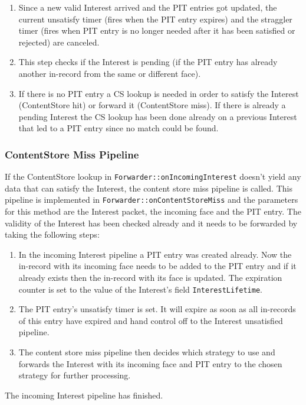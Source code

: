 \begin{enumerate}
\item Since a new valid Interest arrived and the PIT entries got updated, the current unsatisfy timer (fires when the PIT entry expires) and the straggler timer (fires when PIT entry is no longer needed after it has been satisfied or rejected) are canceled.
\item This step checks if the Interest is pending (if the PIT entry has already another in-record from the same or different face).
\item If there is no PIT entry a CS lookup is needed in order to satisfy the Interest (ContentStore hit) or forward it (ContentStore miss). If there is already a pending Interest the CS lookup has been done already on a previous Interest that led to a PIT entry since no match could be found.
\end{enumerate}

\subsubsection{ContentStore Miss Pipeline}

If the ContentStore lookup in \texttt{Forwarder::onIncomingInterest} doesn't yield any data that can satisfy the Interest, the content store miss pipeline is called. This pipeline is implemented in \texttt{Forwarder::onContentStoreMiss} and the parameters for this method are the Interest packet, the incoming face and the PIT entry. The validity of the Interest has been checked already and it needs to be forwarded by taking the following steps:

\begin{enumerate}
\item In the incoming Interest pipeline a PIT entry was created already. Now the in-record with its incoming face needs to be added to the PIT entry and if it already exists then the in-record with its face is updated. The expiration counter is set to the value of the Interest's field \texttt{InterestLifetime}.
\item The PIT entry's unsatisfy timer is set. It will expire as soon as all in-records of this entry have expired and hand control off to the Interest unsatisfied pipeline.
\item The content store miss pipeline then decides which strategy to use and forwards the Interest with its incoming face and PIT entry to the chosen strategy for further processing.
\end{enumerate}

The incoming Interest pipeline has finished.


